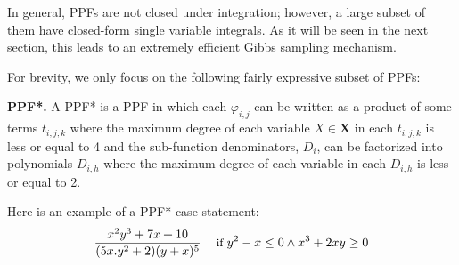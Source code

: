 \documentclass{article}
\renewcommand{\vec}[1]{\mathbf{#1}}
\newcommand{\bvec}[1]{\textbf{#1}}
\newcommand{\singlecase}[2]{#2 \quad \text{ if } #1}
\begin{document}
{%

In general, PPFs are not closed under integration; however, a large subset of them 
 have closed-form single variable integrals.
As it will be seen in the next section,
this leads to an extremely efficient Gibbs sampling mechanism.   

For brevity, we only focus on the following fairly expressive  subset of PPFs:

\textbf{PPF*. }
A PPF* is a PPF in which %
each $\varphi_{i,j}$
can be written as a product of some terms $t_{i,j,k}$ where the maximum degree of each variable $X \in \bvec{X}$ in each $t_{i,j,k}$ is less or equal to 4 %
and the sub-function denominators, $D_{i}$, can be factorized into polynomials ${D}_{i,h}$ where the maximum degree of each variable in each $D_{i,h}$ is less or equal to 2.%

Here is an example of a PPF* case statement:
\begin{equation*}\vspace{-0.5mm}
{\footnotesize
\singlecase{y^2-x\leq 0 \wedge x^3+2xy \geq 0}{\frac{x^2 y^3 + 7x + 10}{(5x.y^2 + 2)(y + x)^5}}
}
\end{equation*}

}
\end{document}
